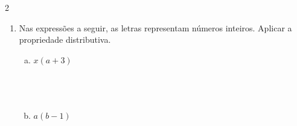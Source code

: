 \documentclass[a4paper,14pt]{article}
\begin{document}
\begin{multicols}{2}
\begin{enumerate}
\begin{enumerate}[a)]
    			\item $x^2 - ax$ \\\\\\\\
    			\item $xy^4 + x^3$ \\\\\\\\
    			\item $7x^3 - 4x + 2x^2$ \\\\\\\\
    			\item $x^3 - 4xy + xyz$ \\\\\\\\
    			\item $-x^2 + 3xy - x$ \\\\\\\\
    			\item $-2ax^3 - 3bx$ \\\\\\\\
    			\item $8ax^2 - x^3 + 5x$ \\\\\\\\
    			\item $-6x^4 - 3x^2 + x$ \\\\\\\\
    			\item $3a^2x + 2bx^2 - x$ \newpage
    		\end{enumerate}
    		\item Nas expressões a seguir, as letras representam números inteiros. Aplicar a propriedade distributiva.
    		\begin{enumerate}[a)]
    			\item $x(a + 3)$ \\\\\\\\
    			\item $a(b - 1)$ \\\\\\\\

\end{enumerate}
\end{enumerate}
\end{multicols}
\end{document}

